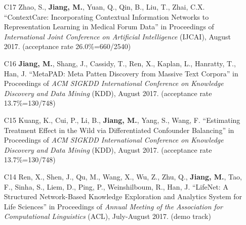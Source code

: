 \documentclass[10pt]{article}
\newenvironment{myindentpar}[1]%
{\begin{list}{}%
         {\setlength{\leftmargin}{#1}}%
         \item[]%
}
{\end{list}}
\newcounter{list}
\begin{document}
\begin{myindentpar}{0.00cm}
\begin{enumerate}[leftmargin=.5cm]
\vspace{-0.1cm}

\item[C17] Zhao, S., \textbf{Jiang, M.}, Yuan, Q., Qin, B., Liu, T., Zhai, C.X. ``ContextCare: Incorporating Contextual Information Networks to Representation Learning in Medical Forum Data'' in Proceedings of \emph{International Joint Conference on Artificial Intelligence} (IJCAI), August 2017. (acceptance rate 26.0\%=660/2540)

\vspace{-0.1cm}

\item[C16] \textbf{Jiang, M.}, Shang, J., Cassidy, T., Ren, X., Kaplan, L., Hanratty, T., Han, J. ``MetaPAD: Meta Patten Discovery from Massive Text Corpora'' in Proceedings of \emph{ACM SIGKDD International Conference on Knowledge Discovery and Data Mining} (KDD), August 2017. (acceptance rate 13.7\%=130/748)

\vspace{-0.1cm}

\item[C15] Kuang, K., Cui, P., Li, B., \textbf{Jiang, M.}, Yang, S., Wang, F. ``Estimating Treatment Effect in the Wild via Differentiated Confounder Balancing'' in Proceedings of \emph{ACM SIGKDD International Conference on Knowledge Discovery and Data Mining} (KDD), August 2017. (acceptance rate 13.7\%=130/748)

\vspace{-0.1cm}

\item[C14] Ren, X., Shen, J., Qu, M., Wang, X., Wu, Z., Zhu, Q., \textbf{Jiang, M.}, Tao, F., Sinha, S., Liem, D., Ping, P., Weinshilboum, R., Han, J. ``LifeNet: A Structured Network-Based Knowledge Exploration and Analytics System for Life Sciences'' in Proceedings of \emph{Annual Meeting of the Association for Computational Linguistics} (ACL), July-August 2017. (demo track)


\end{enumerate}
\end{myindentpar}
\end{document}
